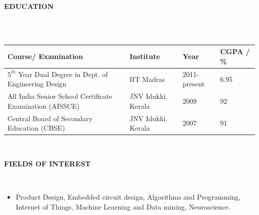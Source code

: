 \documentclass[a4paper,10pt]{article}
\newcommand{\lsep}{-0.5cm}
\newcommand{\resheading}[1]{{\small \colorbox{mygrey}{\begin{minipage}{0.975\textwidth}{\textbf{#1 \vphantom{p\^{E}}}}\end{minipage}}}}
\begin{document}
\resheading{\textbf{EDUCATION} }\\[\lsep]
    \\

    \indent \begin{tabularx}{0.97\textwidth}{ X  p{3.4cm}  p{2.3cm} p{2cm} }
    \hline
    \textbf{Course/ Examination} & \textbf{Institute} & \textbf{Year} & \textbf{CGPA / \%} \\
    \hline
    $5^{th}$ Year Dual Degree in Dept. of Engineering Design & IIT Madras & 2011-present & 6.95\\
    All India Senior School Certificate Examination (AISSCE) & JNV Idukki, Kerala & 2009 & 92\\
    Central Board of Secondary Education (CBSE) & JNV Idukki, Kerala & 2007 & 91\\
    \hline
    \end{tabularx}
    \\


\resheading{\textbf{FIELDS OF INTEREST} }\\[\lsep]
    \begin{itemize}
        \item \noindent Product Design, Embedded circuit design, Algorithms and Programming, Internet of Things, Machine Learning and Data mining, Neuroscience.
    \end{itemize}
\end{document}
